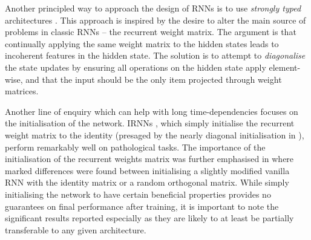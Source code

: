 Another principled way to approach the design of RNNs is to use \emph{strongly typed} architectures
\autocite{Balduzzi2016}. This approach is inspired by the desire to alter the main source of problems
in classic RNNs -- the recurrent weight matrix. The argument is that continually applying the same
weight matrix to the hidden states leads to incoherent features in the hidden state. The solution is
to attempt to \emph{diagonalise} the state updates by ensuring all operations on the
hidden state apply element-wise, and that the input should be the only item projected through weight
matrices.

Another line of enquiry which can help with long time-dependencies focuses on the initialisation
of the network. IRNNs \autocite{Le2015}, which simply initialise the recurrent weight matrix to the
identity (presaged by the nearly diagonal initialisation in \autocite{Mikolov2015}), perform
remarkably well on pathological tasks. The importance of the initialisation of the recurrent weights
matrix was further emphasised in \autocite{Henaff2016} where marked differences were found between
initialising a slightly modified vanilla RNN with the identity matrix or a random orthogonal matrix.
While simply initialising the network to have certain beneficial properties provides no guarantees
on final performance after training, it is important to note the significant results reported
especially as they are likely to at least be partially transferable to any given architecture.
%
%
%


